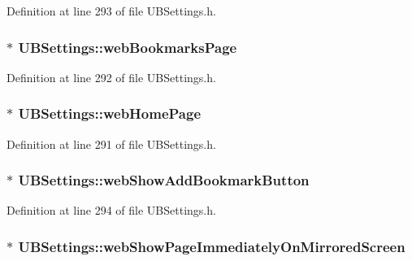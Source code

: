 Definition at line 293 of file U\-B\-Settings.\-h.

\hypertarget{class_u_b_settings_ac95325200a02330d13b31458916a2d4a}{
\subsubsection[{web\-Bookmarks\-Page}]{$\ast$ U\-B\-Settings\-::web\-Bookmarks\-Page}}\label{db/d66/class_u_b_settings_ac95325200a02330d13b31458916a2d4a}


Definition at line 292 of file U\-B\-Settings.\-h.

\hypertarget{class_u_b_settings_a81373d964e3fa4a318429ff86ba291ae}{
\subsubsection[{web\-Home\-Page}]{$\ast$ U\-B\-Settings\-::web\-Home\-Page}}\label{db/d66/class_u_b_settings_a81373d964e3fa4a318429ff86ba291ae}


Definition at line 291 of file U\-B\-Settings.\-h.

\hypertarget{class_u_b_settings_ae9ed072bbf0fed079bba6a8e976fa4d5}{
\subsubsection[{web\-Show\-Add\-Bookmark\-Button}]{$\ast$ U\-B\-Settings\-::web\-Show\-Add\-Bookmark\-Button}}\label{db/d66/class_u_b_settings_ae9ed072bbf0fed079bba6a8e976fa4d5}


Definition at line 294 of file U\-B\-Settings.\-h.

\hypertarget{class_u_b_settings_a05cdb824b75f8ef7d150524e23d4bcf7}{
\subsubsection[{web\-Show\-Page\-Immediately\-On\-Mirrored\-Screen}]{$\ast$ U\-B\-Settings\-::web\-Show\-Page\-Immediately\-On\-Mirrored\-Screen}}\label{db/d66/class_u_b_settings_a05cdb824b75f8ef7d150524e23d4bcf7}


